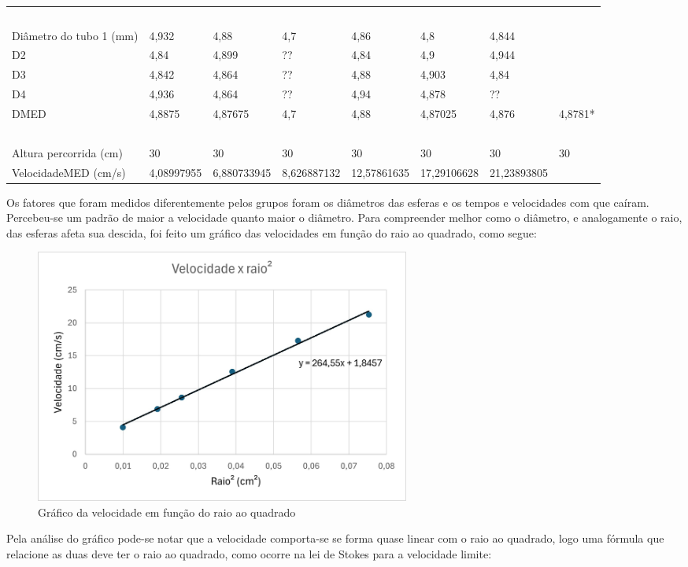 \begin{table}[H]
{\begin{tabular}{l l l l l l l l}
        ~ & ~ & ~ & ~ & ~ & ~ & ~ &   \\ 
        Diâmetro do tubo 1 (mm) & 4,932 & 4,88 & 4,7 & 4,86 & 4,8 & 4,844 &   \\ 
        D2 & 4,84 & 4,899 & ?? & 4,84 & 4,9 & 4,944 &   \\ 
        D3 & 4,842 & 4,864 & ?? & 4,88 & 4,903 & 4,84 &   \\ 
        D4 & 4,936 & 4,864 & ?? & 4,94 & 4,878 & ?? &   \\ 
        DMED & 4,8875 & 4,87675 & 4,7 & 4,88 & 4,87025 & 4,876 & 4,8781*  \\ 
        ~ & ~ & ~ & ~ & ~ & ~ & ~ &   \\ 
        Altura percorrida (cm) & 30 & 30 & 30 & 30 & 30 & 30 & 30  \\ 
        VelocidadeMED (cm/s) & 4,08997955 & 6,880733945 & 8,626887132 & 12,57861635 & 17,29106628 & 21,23893805 &   \\ \hline
    \end{tabular}
    } %
\end{table}
Os fatores que foram medidos diferentemente pelos grupos foram os diâmetros das esferas e os tempos e velocidades com que caíram. Percebeu-se um padrão de maior a velocidade quanto maior o diâmetro. Para compreender melhor como o diâmetro, e analogamente o raio, das esferas afeta sua descida, foi feito um gráfico das velocidades em função do raio ao quadrado, como segue:
\begin{figure}[H]
    \centering
    \includegraphics[width=0.6\textwidth]{fig/GraficoViscosimetroV2.jpg}
    \caption{Gráfico da velocidade em função do raio ao quadrado}
    \label{fig:grafVisc}
\end{figure}
Pela análise do gráfico pode-se notar que a velocidade comporta-se se forma quase linear com o raio ao quadrado, logo uma fórmula que relacione as duas deve ter o raio ao quadrado, como ocorre na lei de Stokes para a velocidade limite:
